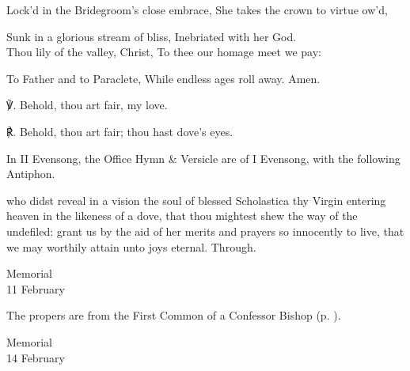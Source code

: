 \begin{paracol}{2}[]
\begin{hangparas}{1.25em}{1}
Lock'd in the Bridegroom's close embrace, She takes the crown to virtue ow'd,

Sunk in a glorious stream of bliss, Inebriated with her God.\\

Thou lily of the valley, Christ, To thee our homage meet we pay:

To Father and to Paraclete, While endless ages roll away. Amen.\\
\end{hangparas}

℣. Behold, thou art fair, my love.  

℟. Behold, thou art fair; thou hast dove's eyes.

\end{paracol}

\begin{rubric}
	In II Evensong, the Office Hymn \& Versicle are of I Evensong, with the following Antiphon.
\end{rubric}


\collect
{} who didst reveal in a vision the soul of blessed Scholastica thy Virgin entering heaven in the likeness of a dove, that thou mightest shew the way of the undefiled: grant us by the aid of her merits and prayers so innocently to live, that we may worthily attain unto joys eternal. Through.


\begin{inhead}
    {Memorial\\
11 February}
\end{inhead}

\begin{rubric}
	The propers are from the First Common of a Confessor Bishop (p. \pageref{CommonConfessorBishopI}).
\end{rubric}


\begin{inhead}
    {Memorial\\
14 February}
\end{inhead}

